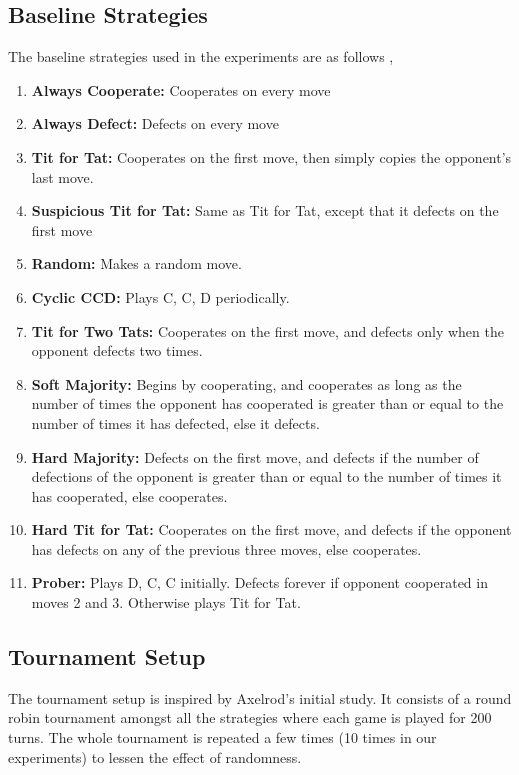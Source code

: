 \documentclass[a4paper]{article}
\begin{document}
	\subsection{Baseline Strategies}
	
	The baseline strategies used in the experiments are as follows \cite{optimalipd},
	\begin{enumerate}
	
	\item \textbf{Always Cooperate:} Cooperates on every move
	\item \textbf{Always Defect:} Defects on every move
	\item \textbf{Tit for Tat:} Cooperates on the first move, then simply copies the opponent's last move.
	\item \textbf{Suspicious Tit for Tat:} Same as Tit for Tat, except that it defects on the first move
	\item \textbf{Random:} Makes a random move.
	\item \textbf{Cyclic CCD:} Plays C, C, D periodically.
	\item \textbf{Tit for Two Tats:} Cooperates on the first move, and defects only when the opponent defects two times.
	\item \textbf{Soft Majority:} Begins by cooperating, and cooperates as long as the number of times the opponent has
cooperated is greater than or equal to the number of times it has defected, else it defects.
	\item \textbf{Hard Majority:} Defects on the first move, and defects if the number of defections of the opponent is greater than or equal to the number of times it has cooperated, else cooperates.
	\item \textbf{Hard Tit for Tat:} Cooperates on the first move, and defects if the opponent has defects on any of the previous three moves, else cooperates.
	\item \textbf{Prober:} Plays D, C, C initially. Defects forever if opponent cooperated in moves 2 and 3. Otherwise plays Tit for Tat.	
	\end{enumerate}
	
	\subsection{Tournament Setup}
	
	The tournament setup is inspired by Axelrod's initial study. It consists of a round robin tournament amongst all the strategies where each game is played for 200 turns. The whole tournament is repeated a few times (10 times in our experiments) to lessen the effect of randomness.
\end{document}
